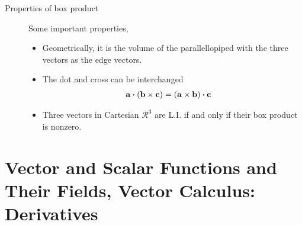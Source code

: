 \begin{description}
    \item[Properties of box product] Some important properties,
        \begin{itemize}
            \item Geometrically, it is the volume of the parallellopiped with the three
                  vectors as the edge vectors.
            \item The dot and cross can be interchanged
                  \begin{align}
                      \mathbf{a} \boldsymbol{\cdot} (\mathbf{b} \times \mathbf{c}) & =
                      (\mathbf{a} \times \mathbf{b}) \boldsymbol{\cdot} \mathbf{c}
                  \end{align}
            \item Three vectors in Cartesian $ \mathcal{R}^3 $ are L.I. if and only if
                  their box product is nonzero.
        \end{itemize}
\end{description}

\section{Vector and Scalar Functions and Their Fields, Vector Calculus: Derivatives}

